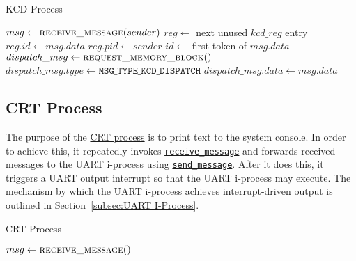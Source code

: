 \documentclass[12pt]{report}
\begin{document}
\begin{algorithm}
\caption{KCD Process}
\label{alg:kcdprocess}
\begin{algorithmic}[1]
        \State $msg \leftarrow \Call{receive\_message}{sender}$
            \State $reg \leftarrow$ next unused $kcd\_reg$ entry
            \State $reg.id \leftarrow msg.data$
            \State $reg.pid \leftarrow sender$
            \State $id \leftarrow$ first token of $msg.data$
                \State $dispatch\_msg \leftarrow \Call{request\_memory\_block}{\null}$
                \State $dispatch\_msg.type \leftarrow \texttt{MSG_TYPE_KCD_DISPATCH}$
                \State $dispatch\_msg.data \leftarrow msg.data$
                \State {}
            \EndIf
        \EndIf
        \State {}
    \EndWhile
\EndProcedure
\end{algorithmic}
\end{algorithm}

\subsection{CRT Process}

The purpose of the \hyperref[alg:crtprocess]{CRT process} is to print text to the system console. In order to achieve this, it repeatedly invokes \hyperref[alg:receivingmessages]{\texttt{receive_message}} and forwards received messages to the UART i-process using \hyperref[alg:sendingmessages]{\texttt{send_message}}. After it does this, it triggers a UART output interrupt so that the UART i-process may execute. The mechanism by which the UART i-process achieves interrupt-driven output is outlined in Section~\ref{subsec:UART I-Process}.\\

\begin{algorithm}
\caption{CRT Process}
\label{alg:crtprocess}
\begin{algorithmic}[1]
        \State $msg \leftarrow \Call{receive\_message}{\null}$
            \State {}
        \Else
            \State {}
        \EndIf
    \EndWhile
\EndProcedure
\end{algorithmic}
\end{algorithm}
\end{document}
